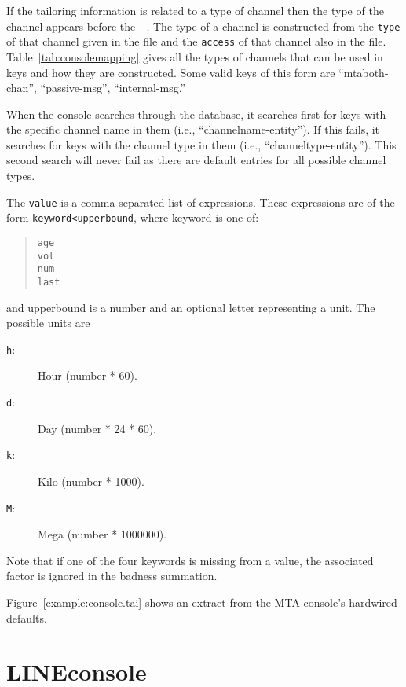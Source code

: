 If the tailoring information is related to a type of channel then the
type of the channel appears before the~\verb+-+.
The type of a channel is constructed from the \verb+type+ of that channel
given in the  file and the \verb+access+ of that channel also in
the  file.
Table~\ref{tab:consolemapping} gives all the types of channels that can
be used in keys and how they are constructed.
Some
valid keys of this form are ``mtaboth-chan'', ``passive-msg'',
``internal-msg.''

When the console searches through the database, it searches first for
keys with the specific channel name in them  (i.e., ``channelname-entity'').
If this fails, it searches for keys with the channel type in them
(i.e., ``channeltype-entity'').
This second search will never fail as there are default entries for all possible
channel types.


The \verb+value+ is a comma-separated list of expressions.
These expressions are of the form \verb+keyword<upperbound+, where
keyword is one of:
\begin{quote}\small\begin{verbatim}
age
vol
num
last
\end{verbatim}\end{quote}
and upperbound is a number and an optional letter representing a unit.
The possible units are
\begin{description}
\item[\verb+h+:] Hour (number * 60).
\item[\verb+d+:] Day (number * 24 * 60).
\item[\verb+k+:] Kilo (number * 1000).
\item[\verb+M+:] Mega (number * 1000000).
\end{description}
Note that if one of the four keywords is missing from a value, the
associated factor is ignored in the badness summation.

Figure~\ref{example:console.tai} shows an extract from the MTA
console's hardwired defaults.


\section {LINEconsole}

